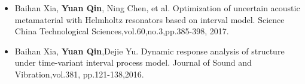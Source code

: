 %
%


\linespread{1.5}
\begin{itemize}
	\item Baihan Xia, \textbf{Yuan Qin}, Ning Chen, et al. Optimization of uncertain acoustic metamaterial with Helmholtz resonators based on interval model. Science China Technological Sciences,vol.60,no.3,pp.385-398, 2017.
	\item Baihan Xia, \textbf{Yuan Qin},Dejie Yu. Dynamic response analysis of structure under time-variant interval process model. Journal of Sound and Vibration,vol.381, pp.121-138,2016.
\end{itemize}
